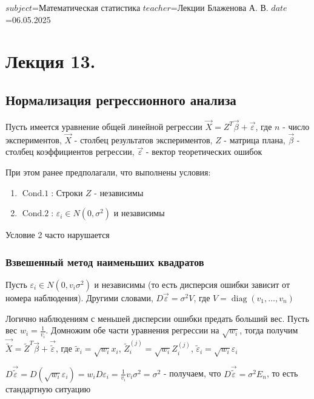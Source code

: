 $subject$=Математическая статистика
$teacher$=Лекции Блаженова А. В.
$date$=06.05.2025

\section{Лекция 13.}

\subsection{Нормализация регрессионного анализа}

Пусть имеется уравнение общей линейной регрессии $\vec X = Z^T \vec \beta + \vec \varepsilon$, где $n$ - число экспериментов, $\vec X$ - столбец результатов экспериментов, $Z$ - матрица плана, $\vec \beta$ - столбец коэффициентов регрессии, $\vec \varepsilon$ - вектор теоретических ошибок

При этом ранее предполагали, что выполнены условия:

\begin{enumerate}
    \item $\operatorname{Cond. 1}$: Строки $Z$ - независимы
    \item $\operatorname{Cond. 2}$: $\varepsilon_i \in N(0, \sigma^2)$ и независимы
\end{enumerate}

Условие 2 часто нарушается

\hypertarget{weighted_mls}{}

\subsubsection{Взвешенный метод наименьших квадратов}

Пусть $\varepsilon_i \in N(0, v_i \sigma^2)$ и независимы (то есть дисперсия ошибки зависит от номера наблюдения). Другими словами, $D \vec \varepsilon = \sigma^2 V$, где $V = \operatorname{diag} (v_1, \dots, v_n)$

Логично наблюдениям с меньшей дисперсии ошибки предать больший вес. Пусть вес $w_i = \frac{1}{v_i}$. Домножим обе части уравнения регрессии на $\sqrt{w_i}$, тогда получим $\vec \tilde{X} = \tilde Z^T \vec \beta + \vec \tilde{\varepsilon}$, где $\tilde x_i=  \sqrt{w_i} x_i$, $\tilde Z^{(j)}_i = \sqrt{w_i} Z^{(j)}_i$, $\tilde \varepsilon_i = \sqrt{w_i} \varepsilon_i$

$D \vec \tilde{\varepsilon} = D(\sqrt{w_i} \varepsilon_i) = w_i D \varepsilon_i = \frac{1}{v_i} v_i \sigma^2 = \sigma^2$ - получаем, что $D \vec \tilde{\varepsilon} = \sigma^2 E_n$, то есть стандартную ситуацию

